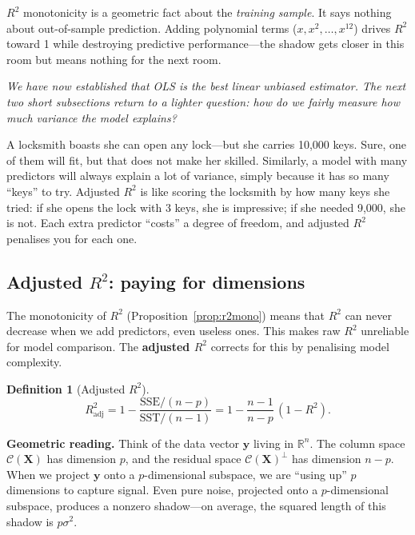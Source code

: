 \documentclass[11pt,a4paper]{article}
\theoremstyle{plain}
\theoremstyle{definition}
\newtheorem{definition}[theorem]{Definition}
\newcommand{\R}{\mathbb{R}}
\newcommand{\bX}{\bm{X}}
\newcommand{\by}{\bm{y}}
\newcommand{\Col}{\mathcal{C}}
\begin{document}
\begin{warning}
$R^2$ monotonicity is a geometric fact about the \emph{training sample}.
It says nothing about out-of-sample prediction.
Adding polynomial terms ($x, x^2,\dots,x^{12}$) drives $R^2$ toward 1
while destroying predictive performance---the shadow gets closer in this
room but means nothing for the next room.
\end{warning}

\medskip
\noindent\textit{We have now established that OLS is the best linear unbiased estimator.
The next two short subsections return to a lighter question: how do we
fairly measure how much variance the model explains?}

\begin{toystory}
A locksmith boasts she can open any lock---but she carries 10{,}000
keys.  Sure, one of them will fit, but that does not make her skilled.
Similarly, a model with many predictors will always explain a lot of
variance, simply because it has so many ``keys'' to try.
Adjusted $R^2$ is like scoring the locksmith by how many keys she tried:
if she opens the lock with 3 keys, she is impressive; if she needed
9{,}000, she is not.  Each extra predictor ``costs'' a degree of
freedom, and adjusted $R^2$ penalises you for each one.
\end{toystory}

\subsection{Adjusted $R^2$: paying for dimensions}\label{sec:adj-r2}

The monotonicity of $R^2$ (Proposition~\ref{prop:r2mono}) means that
$R^2$ can never decrease when we add predictors, even useless ones.
This makes raw $R^2$ unreliable for model comparison.
The \textbf{adjusted $R^2$} corrects for this by penalising model complexity.

\begin{definition}[Adjusted $R^2$]
\[
  R^2_{\text{adj}}
  = 1 - \frac{\text{SSE}/(n-p)}{\text{SST}/(n-1)}
  = 1 - \frac{n-1}{n-p}\,(1-R^2).
\]
\end{definition}

\noindent\textbf{Geometric reading.}
Think of the data vector $\by$ living in $\R^n$.
The column space $\Col(\bX)$ has dimension $p$, and the residual space
$\Col(\bX)^\perp$ has dimension $n - p$.
When we project $\by$ onto a $p$-dimensional subspace, we are ``using up''
$p$ dimensions to capture signal.  Even pure noise, projected onto a
$p$-dimensional subspace, produces a nonzero shadow---on average, the
squared length of this shadow is $p\sigma^2$.
\end{document}
